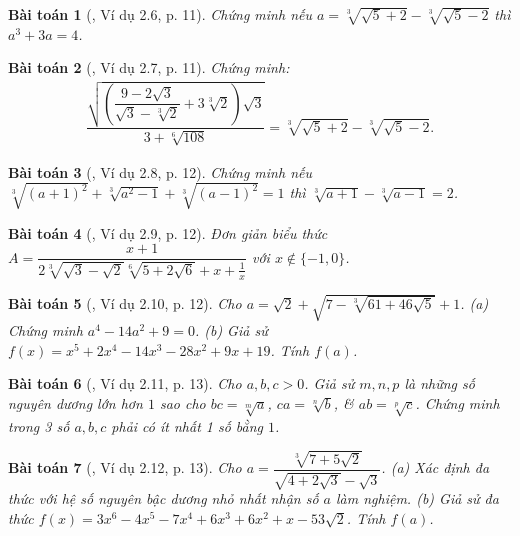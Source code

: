\documentclass{article}
\newtheorem{baitoan}{Bài toán}
\begin{document}
\begin{baitoan}[\cite{TLCT_THCS_Toan_9_dai_so}, Ví dụ 2.6, p. 11]
	Chứng minh nếu $a = \sqrt[3]{\sqrt{5} + 2} - \sqrt[3]{\sqrt{5} - 2}$ thì $a^3 + 3a = 4$.
\end{baitoan}

\begin{baitoan}[\cite{TLCT_THCS_Toan_9_dai_so}, Ví dụ 2.7, p. 11]
	Chứng minh:
	\begin{align*}
		\dfrac{\sqrt{\left(\dfrac{9 - 2\sqrt{3}}{\sqrt{3} - \sqrt[3]{2}} + 3\sqrt[3]{2}\right)\sqrt{3}}}{3 + \sqrt[6]{108}} = \sqrt[3]{\sqrt{5} + 2} - \sqrt[3]{\sqrt{5} - 2}.
	\end{align*}
\end{baitoan}

\begin{baitoan}[\cite{TLCT_THCS_Toan_9_dai_so}, Ví dụ 2.8, p. 12]
	Chứng minh nếu $\sqrt[3]{(a + 1)^2} + \sqrt[3]{a^2 - 1} + \sqrt[3]{(a - 1)^2} = 1$ thì $\sqrt[3]{a + 1} - \sqrt[3]{a - 1} = 2$.
\end{baitoan}

\begin{baitoan}[\cite{TLCT_THCS_Toan_9_dai_so}, Ví dụ 2.9, p. 12]
	Đơn giản biểu thức $A = \dfrac{x + 1}{2\sqrt[3]{\sqrt{3} - \sqrt{2}}\sqrt[6]{5 + 2\sqrt{6}} + x + \frac{1}{x}}$ với $x\notin\{-1,0\}$.
\end{baitoan}

\begin{baitoan}[\cite{TLCT_THCS_Toan_9_dai_so}, Ví dụ 2.10, p. 12]
	Cho $a = \sqrt{2} + \sqrt{7 - \sqrt[3]{61 + 46\sqrt{5}}} + 1$. (a) Chứng minh $a^4 - 14a^2 + 9 = 0$. (b) Giả sử $f(x) = x^5 + 2x^4 - 14x^3 - 28x^2 + 9x + 19$. Tính $f(a)$.
\end{baitoan}

\begin{baitoan}[\cite{TLCT_THCS_Toan_9_dai_so}, Ví dụ 2.11, p. 13]
	Cho $a,b,c > 0$. Giả sử $m,n,p$ là những số nguyên dương lớn hơn $1$ sao cho $bc = \sqrt[m]{a}$, $ca = \sqrt[n]{b}$, \& $ab = \sqrt[p]{c}$. Chứng minh trong 3 số $a,b,c$ phải có ít nhất 1 số bằng $1$.
\end{baitoan}

\begin{baitoan}[\cite{TLCT_THCS_Toan_9_dai_so}, Ví dụ 2.12, p. 13]
	Cho $a = \dfrac{\sqrt[3]{7 + 5\sqrt{2}}}{\sqrt{4 + 2\sqrt{3}} - \sqrt{3}}$. (a) Xác định đa thức với hệ số nguyên bậc dương nhỏ nhất nhận số $a$ làm nghiệm. (b) Giả sử đa thức $f(x) = 3x^6 - 4x^5 - 7x^4 + 6x^3 + 6x^2 + x - 53\sqrt{2}$. Tính $f(a)$.
\end{baitoan}
\end{document}
